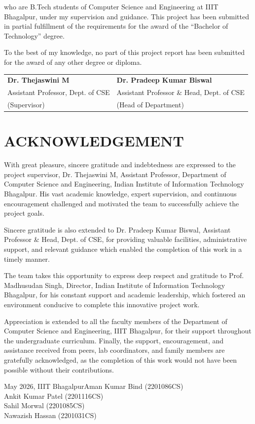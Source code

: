\documentclass[12pt, a4paper]{report}
\newcommand{\degreeNameMixed}{Bachelor of Technology}
\newcommand{\departmentMixed}{Department of Computer Science and Engineering}
\newcommand{\instituteMixed}{Indian Institute of Information Technology Bhagalpur}
\newcommand{\instituteShort}{IIIT Bhagalpur}
\newcommand{\submissionMonthYearMixed}{May 2026}
\newcommand{\studentOneName}{Aman Kumar Bind}
\newcommand{\studentOneRoll}{2201086CS}
\newcommand{\studentTwoName}{Ankit Kumar Patel}
\newcommand{\studentTwoRoll}{2201116CS}
\newcommand{\studentThreeName}{Sahil Morwal}
\newcommand{\studentThreeRoll}{2201085CS}
\newcommand{\studentFourName}{Nawazish Hassan}
\newcommand{\studentFourRoll}{2201031CS}
\newcommand{\supervisorName}{Dr. Thejaswini M}
\newcommand{\supervisorDesignation}{Assistant Professor}
\newcommand{\hodName}{Dr. Pradeep Kumar Biswal}
\newcommand{\hodDesignation}{Assistant Professor \& Head, Dept. of CSE}
\newcommand{\directorName}{Prof. Madhusudan Singh}
\begin{document}
who are B.Tech students of Computer Science and Engineering at \instituteShort, under my supervision and guidance. This project has been submitted in partial fulfillment of the requirements for the award of the ``\degreeNameMixed'' degree.

To the best of my knowledge, no part of this project report has been submitted for the award of any other degree or diploma.

\vspace{2cm}

\noindent
\begin{tabular}{p{7cm}p{7cm}}
\textbf{\supervisorName} & \textbf{\hodName}\\
\supervisorDesignation, Dept. of CSE &
\hodDesignation\\
(Supervisor) & (Head of Department)
\end{tabular}

\chapter*{ACKNOWLEDGEMENT}
With great pleasure, sincere gratitude and indebtedness are expressed to the project supervisor, \supervisorName, \supervisorDesignation, \departmentMixed, \instituteMixed. His vast academic knowledge, expert supervision, and continuous encouragement challenged and motivated the team to successfully achieve the project goals. 

Sincere gratitude is also extended to \hodName, \hodDesignation, for providing valuable facilities, administrative support, and relevant guidance which enabled the completion of this work in a timely manner.

The team takes this opportunity to express deep respect and gratitude to \directorName, Director, \instituteMixed, for his constant support and academic leadership, which fostered an environment conducive to complete this innovative project work.

Appreciation is extended to all the faculty members of the \departmentMixed, \instituteShort, for their support throughout the undergraduate curriculum. Finally, the support, encouragement, and assistance received from peers, lab coordinators, and family members are gratefully acknowledged, as the completion of this work would not have been possible without their contributions.

\vspace{1cm}
\noindent \submissionMonthYearMixed, \instituteShort \hfill \studentOneName{} (\studentOneRoll)\\
\null \hfill \studentTwoName{} (\studentTwoRoll)\\
\null \hfill \studentThreeName{} (\studentThreeRoll)\\
\null \hfill \studentFourName{} (\studentFourRoll)
\end{document}
